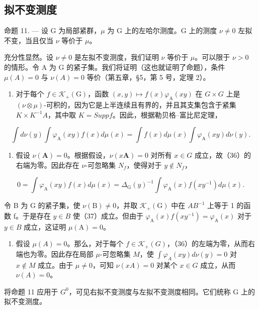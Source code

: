 \subsection{拟不变测度}

命题 11. --- 设 G 为局部紧群，\(\mu\) 为 G 上的左哈尔测度。G 上的测度 \(\nu \neq 0\) 左拟不变，当且仅当 \(\nu\) 等价于 \(\mu\)。

充分性显然。设 \(\nu \neq 0\) 是左拟不变测度，我们证明 \(\nu\) 等价于 \(\mu\)。可以限于 \(\nu > 0\) 的情形。令 A 为 G 的紧子集。我们将证明（这也就证明了命题），条件 \(\mu(A) = 0\) 与 \(\nu(A) = 0\) 等价（第五章，§5，第 5 号，定理 2）。

\begin{enumerate}
\def\labelenumi{\alph{enumi})}
\tightlist
\item
  对于每个 \(f \in \mathcal{K}_{+}(\mathrm{G})\)，函数 \((x, y) \mapsto f(x)\varphi_{\mathrm{A}}(xy)\) 在 \(G \times G\) 上是 \((\nu \otimes \mu)\)-可积的，因为它是上半连续且有界的，并且其支集包含于紧集 \(K \times K^{-1}A\)，其中取 \(K = Supp f\)。因此，根据勒贝格--富比尼定理，
\end{enumerate}

\[
\int d \nu (y) \int \varphi_ {\mathrm{A}} (x y) f (x) d \mu (x) = \int f (x) d \mu (x) \int \varphi_ {\mathrm{A}} (x y) d \nu (y).\tag{36}
\]

\begin{enumerate}
\def\labelenumi{\alph{enumi})}
\setcounter{enumi}{1}
\tightlist
\item
  假设 \(\nu(\mathbf{A}) = 0\)。根据假设，\(\nu(x\mathbf{A}) = 0\) 对所有 \(x \in G\) 成立，故（36）的右端为零。因此存在 \(\nu\)-可忽略集 \(N_{f}\)，使得对于 \(y \notin N_{f}\)，
\end{enumerate}

\[
0 = \int \varphi_ {\mathrm{A}} (x y) f (x) d \mu (x) = \Delta_ {\mathrm{G}} (y) ^ {- 1} \int \varphi_ {\mathrm{A}} (x) f (x y ^ {- 1}) d \mu (x).\tag{37}
\]

令 B 为 G 的紧子集，使 \(\nu(\mathrm{B})\neq0\)，并取 \(\mathcal{K}_{+}(\mathrm{G})\) 中在 \(AB^{-1}\) 上等于 1 的函数 f。于是存在 \(y\in B\) 使（37）成立。但由于 \(\varphi_{\mathrm{A}}(x)f(xy^{-1})=\varphi_{\mathrm{A}}(x)\) 对于 \(y\in B\) 成立，这证明 \(\mu(\mathrm{A})=0\)。

\begin{enumerate}
\def\labelenumi{\alph{enumi})}
\setcounter{enumi}{2}
\tightlist
\item
  假设 \(\mu(A) = 0\)。那么，对于每个 \(f \in \mathcal{K}_{+}(G)\)，（36）的左端为零，从而右端也为零。因此存在局部 \(\mu\)-可忽略集 \(M\)，使 \(\int \varphi_{A}(xy) d\nu(y) = 0\) 对 \(x \notin M\) 成立。由于 \(\mu \neq 0\)，可知 \(\nu(xA) = 0\) 对某个 \(x \in G\) 成立，从而 \(\nu(A) = 0\)。
\end{enumerate}

将命题 11 应用于 \(G^{0}\)，可见右拟不变测度与左拟不变测度相同。它们统称 G 上的拟不变测度。

